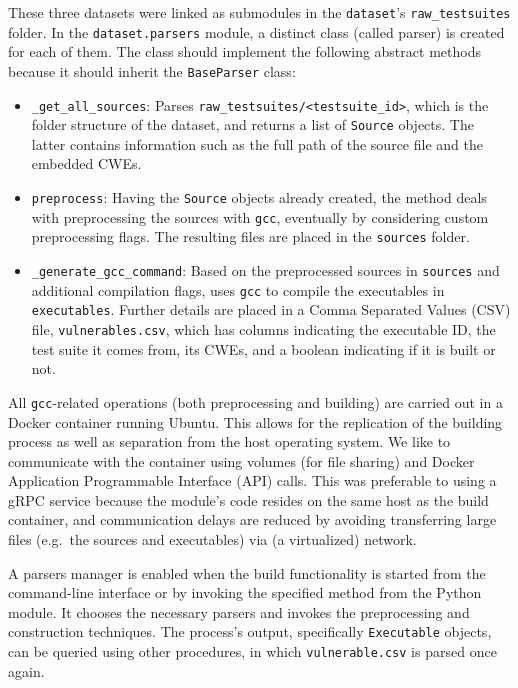 \documentclass[../main.tex]{subfiles}
\begin{document}
These three datasets were linked as submodules in the \texttt{dataset}'s \cite{dataset_module_repo} \texttt{raw\_testsuites} folder. In the
\texttt{dataset.parsers} module, a distinct class (called parser) is
created for each of them. The class should implement the following
abstract methods because it should inherit the \texttt{BaseParser}
class:

\begin{itemize}
\tightlist
\item
  \texttt{\_get\_all\_sources}: Parses \texttt{raw\_testsuites/\textless{}testsuite\_id\textgreater{}}, which is the folder structure of the
  dataset, and returns a list of \texttt{Source} objects. The latter contains
  information such as the full path of the source file and the embedded
  CWEs.
\item
  \texttt{preprocess}: Having the \texttt{Source} objects already
  created, the method deals with preprocessing the sources with
  \texttt{gcc}, eventually by considering custom preprocessing flags.
  The resulting files are placed in the \texttt{sources} folder.
\item
  \texttt{\_generate\_gcc\_command}: Based on the preprocessed sources
  in \texttt{sources} and additional compilation flags, uses
  \texttt{gcc} to compile the executables in \texttt{executables}.
  Further details are placed in a Comma Separated Values (CSV) file, \texttt{vulnerables.csv},
  which has columns indicating the executable ID, the test suite it
  comes from, its CWEs, and a boolean indicating if it is built or not.
\end{itemize}

All \texttt{gcc}-related operations (both preprocessing and building)
are carried out in a Docker container running Ubuntu. This allows for
the replication of the building process as well as separation from the
host operating system. We like to communicate with the container using
volumes (for file sharing) and Docker Application Programmable Interface (API) calls. This was preferable to
using a gRPC service because the module's code resides on the same host
as the build container, and communication delays are reduced by avoiding
transferring large files (e.g.~the sources and executables) via (a
virtualized) network.

A parsers manager is enabled when the build functionality is started
from the command-line interface or by invoking the specified method from
the Python module. It chooses the necessary parsers and invokes the
preprocessing and construction techniques. The process's output,
specifically \texttt{Executable} objects, can be queried using other
procedures, in which \texttt{vulnerable.csv} is parsed once again.
\end{document}

